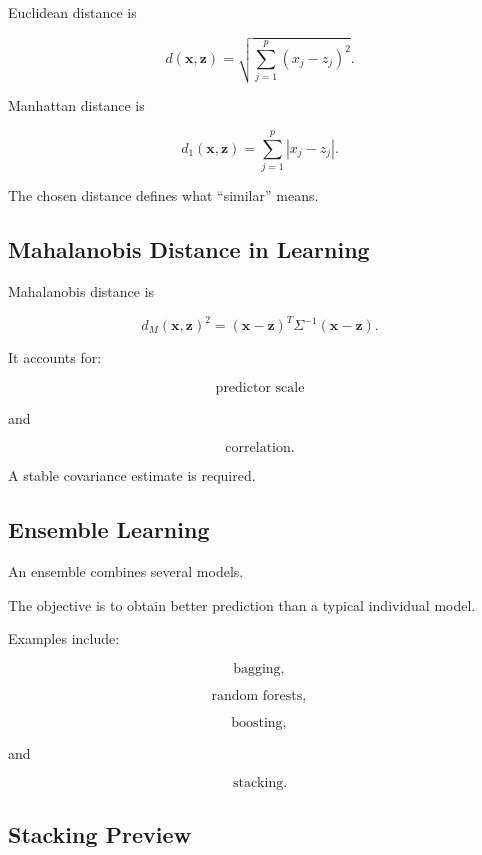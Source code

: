 Euclidean distance is

\[
\boxed{
d(\mathbf{x},\mathbf{z})
=
\sqrt{
\sum_{j=1}^{p}
(
x_j-z_j
)^2
}.
}
\]

Manhattan distance is

\[
\boxed{
d_1
(
\mathbf{x},
\mathbf{z}
)
=
\sum_{j=1}^{p}
|
x_j-z_j
|.
}
\]

The chosen distance defines what ``similar'' means.

\subsection{Mahalanobis Distance in Learning}
\label{subsec:mahalanobis-learning}

Mahalanobis distance is

\[
\boxed{
d_M
(
\mathbf{x},
\mathbf{z}
)^2
=
(
\mathbf{x}-\mathbf{z}
)^T
\Sigma^{-1}
(
\mathbf{x}-\mathbf{z}
).
}
\]

It accounts for:

\[
\boxed{
\text{predictor scale}
}
\]

and

\[
\boxed{
\text{correlation}.
}
\]

A stable covariance estimate is required.

\subsection{Ensemble Learning}
\label{subsec:ensemble-learning}

An ensemble combines several models.

The objective is to obtain better prediction than a typical individual
model.

Examples include:

\[
\boxed{
\text{bagging},
}
\]

\[
\boxed{
\text{random forests},
}
\]

\[
\boxed{
\text{boosting},
}
\]

and

\[
\boxed{
\text{stacking}.
}
\]

\subsection{Stacking Preview}
\label{subsec:stacking-preview}

